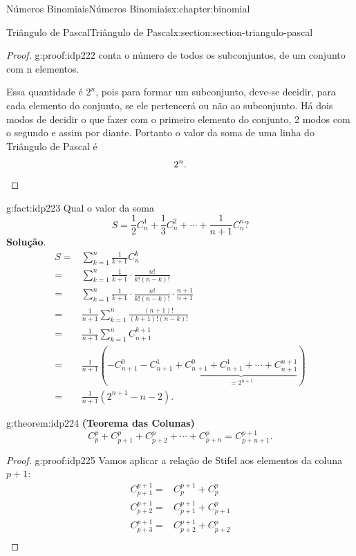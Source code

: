 \documentclass[oneside,10pt,]{book}
\newcommand{\blocktitlefont}{\relax}
\newcommand{\terminology}[1]{\textbf{#1}}
\newcommand{\qedhere}{\relax}
\numberwithin{equation}{section}
\newcommand{\amp}{&}
\begin{document}
\begin{chapterptx}{Números Binomiais}{}{Números Binomiais}{}{}{x:chapter:binomial}
\begin{sectionptx}{Triângulo de Pascal}{}{Triângulo de Pascal}{}{}{x:section:section-triangulo-pascal}
\begin{proof}{}{g:proof:idp222}
conta o número de todos os subconjuntos, de um conjunto com n elementos.%
\par
Essa quantidade é \(2^n\), pois para formar um subconjunto, deve-se decidir, para cada elemento do conjunto, se ele pertencerá ou não ao subconjunto. Há dois modos de decidir o que fazer com o primeiro elemento do conjunto, 2 modos com o segundo e assim por diante. Portanto o valor da soma de uma linha do Triângulo de Pascal é%
\begin{equation*}
2^n. \qedhere
\end{equation*}
%
\end{proof}
\begin{fact}{}{}{g:fact:idp223}%
Qual o valor da soma%
\begin{equation*}
S = \frac{1}{2}C_n^1 + \frac{1}{3}C_n^2 + \cdots + \frac{1}{n+1}C_n^n? 
\end{equation*}
%
\textbf{\blocktitlefont Solução}.\quad{}%
\begin{align*}
S = \amp \sum_{k=1}^n \frac{1}{k+1}C_n^k  \\
= \amp \sum_{k=1}^n \frac{1}{k+1}\cdot \frac{n!}{k!(n-k)!}  \\
= \amp \sum_{k=1}^n \frac{1}{k+1}\cdot \frac{n!}{k!(n-k)!}\cdot \frac{n+1}{n+1}  \\
= \amp \frac{1}{n+1}\sum_{k=1}^n \frac{(n+1)!}{(k+1)!(n-k)!}  \\
= \amp \frac{1}{n+1}\sum_{k=1}^n C_{n+1}^{k+1}  \\
= \amp \frac{1}{n+1}\left( -C_{n+1}^0 - C_{n+1}^1 +\underbrace{C_{n+1}^0 + C_{n+1}^1 + \cdots+C_{n+1}^{n+1}}_{=2^{n+1}} \right)  \\
= \amp \frac{1}{n+1}\left( 2^{n+1} - n -2 \right).  
\end{align*}
\end{fact}
\begin{theorem}{}{}{g:theorem:idp224}%
\terminology{(Teorema das Colunas)}%
\begin{equation*}
C_p^p + C_{p+1}^p + C_{p+2}^p + \cdots + C_{p+n}^p = C_{p+n+1}^{p+1}.
\end{equation*}
\end{theorem}
\begin{proof}{}{g:proof:idp225}
Vamos aplicar a relação de Stifel aos elementos da coluna \(p+1\):%
\begin{align*}
C_{p+1}^{p+1} = \amp C_p^{p+1} + C_p^p  \\
C_{p+2}^{p+1} = \amp C_{p+1}^{p+1} + C_{p+1}^p  \\
C_{p+3}^{p+1} = \amp C_{p+2}^{p+1} + C_{p+2}^p   \\

\end{align*}
\end{proof}
\end{sectionptx}
\end{chapterptx}
\end{document}
